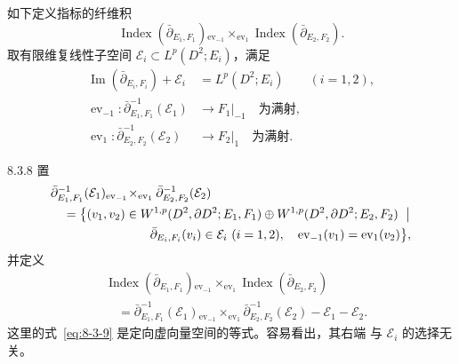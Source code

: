 如下定义指标的纤维积
\[
 \operatorname{Index}(\bar\partial_{E_1,F_1})
 {}_{\operatorname{ev}_{-1}}\!\times_{\operatorname{ev}_1}
 \operatorname{Index}(\bar\partial_{E_2,F_2}).
\]
取有限维复线性子空间
$\mathcal E_i\subset L^p(D^2;E_i)$，满足
\begin{align}
 \operatorname{Im}(\bar\partial_{E_i,F_i})+\mathcal E_i
 &=L^p(D^2;E_i)\qquad(i=1,2),
 \tag{8.3.6}\label{eq:8-3-6}\\
 \operatorname{ev}_{-1}\colon
 \bar\partial_{E_1,F_1}^{-1}(\mathcal E_1)
 &\longrightarrow F_1|_{-1}\quad\text{为满射},
 \tag{8.3.7.1}\label{eq:8-3-7-1}\\
 \operatorname{ev}_{1}\colon
 \bar\partial_{E_2,F_2}^{-1}(\mathcal E_2)
 &\longrightarrow F_2|_{1}\quad\text{为满射}.
 \tag{8.3.7.2}\label{eq:8-3-7-2}
\end{align}

\begin{definition}{8.3.8}\label{def:8-3-8}
置
\[
\begin{aligned}
 &\bar\partial_{E_1,F_1}^{-1}(\mathcal E_1)
 {}_{\operatorname{ev}_{-1}}\!\times_{\operatorname{ev}_1}
 \bar\partial_{E_2,F_2}^{-1}(\mathcal E_2)\\
 &\quad=\bigl\{(v_1,v_2)\in
 W^{1,p}(D^2,\partial D^2;E_1,F_1)
 \oplus W^{1,p}(D^2,\partial D^2;E_2,F_2)\ \bigm|\\
 &\hspace{8em}
 \bar\partial_{E_i,F_i}(v_i)\in\mathcal E_i\ (i=1,2),\quad
 \operatorname{ev}_{-1}(v_1)=\operatorname{ev}_1(v_2)\bigr\},
\end{aligned}
\]
并定义
\begin{equation}
\begin{aligned}
 &\operatorname{Index}(\bar\partial_{E_1,F_1})
 {}_{\operatorname{ev}_{-1}}\!\times_{\operatorname{ev}_1}
 \operatorname{Index}(\bar\partial_{E_2,F_2})\\
 &\quad=
 \bar\partial_{E_1,F_1}^{-1}(\mathcal E_1)
 {}_{\operatorname{ev}_{-1}}\!\times_{\operatorname{ev}_1}
 \bar\partial_{E_2,F_2}^{-1}(\mathcal E_2)
 -\mathcal E_1-\mathcal E_2.
\end{aligned}
\tag{8.3.9}\label{eq:8-3-9}
\end{equation}
这里的式~\eqref{eq:8-3-9} 是定向虚向量空间的等式。容易看出，其右端
与 $\mathcal E_i$ 的选择无关。%
\end{definition}

